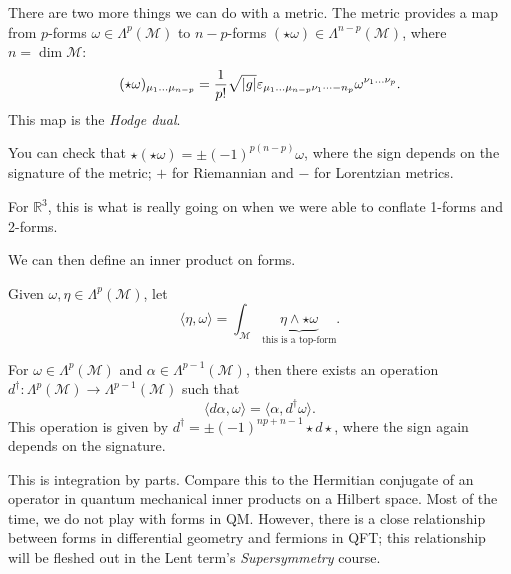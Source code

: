 There are two more things we can do with a metric.
The metric provides a map from $p$-forms $\omega \in \Lambda^p(\mathcal{M})$ to $n-p$-forms $(\star\omega) \in \Lambda^{n-p}(\mathcal{M})$, where $n = \dim \mathcal{M}$:
\begin{equation}
  (\star\omega)_{\mu_1 \dots \mu_{n-p}} = \frac{1}{p!} \sqrt{\abs{g}} \varepsilon_{\mu_1 \dots \mu_{n-p} \nu_1 \dots -n_p} \omega^{\nu_1 \dots \nu_p}.
\end{equation}
This map is the \emph{Hodge dual}. 
\begin{exercise}
  You can check that $\star(\star\omega) = \pm (-1)^{p(n-p)}\omega$, where the sign depends on the signature of the metric; $+$ for Riemannian and $-$ for Lorentzian metrics.
\end{exercise}
\begin{leftbar}
  \begin{remark}
    For $\mathbb{R}^3$, this is what is really going on when we were able to conflate 1-forms and 2-forms.
  \end{remark}
\end{leftbar}
We can then define an inner product on forms.
\begin{definition}
  Given $\omega, \eta \in \Lambda^p(\mathcal{M})$, let
  \begin{equation}
    \langle \eta, \omega \rangle = \int_{\mathcal{M}} \underbrace{\eta \wedge \star\omega}_{\text{this is a top-form}}.
  \end{equation}
\end{definition}
\begin{claim}
  For $\omega \in \Lambda^p(\mathcal{M})$ and $\alpha \in \Lambda^{p-1}(\mathcal{M})$, then there exists an operation $d^{\dagger}: \Lambda^p(\mathcal{M}) \to \Lambda^{p-1}(\mathcal{M})$ such that
  \begin{equation}
    \langle d\alpha, \omega \rangle = \langle \alpha, d^{\dagger}\omega \rangle.
  \end{equation}
  This operation is given by $d^{\dagger} = \pm (-1)^{np + n -1} \star d \star$, where the sign again depends on the signature.
\end{claim}
\begin{leftbar}
  \begin{remark}
    This is integration by parts.
    Compare this to the Hermitian conjugate of an operator in quantum mechanical inner products on a Hilbert space. Most of the time, we do not play with forms in QM.
    However, there is a close relationship between forms in differential geometry and fermions in QFT; this relationship will be fleshed out in the Lent term's \emph{Supersymmetry} course.
  \end{remark}
\end{leftbar}
